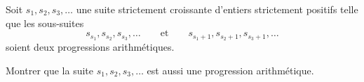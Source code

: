 Soit $s_1, s_2, s_3, \ldots$ une suite strictement croissante d'entiers strictement positifs telle que les
sous-suites
\[
s_{s_1}, s_{s_2}, s_{s_3}, \ldots \qquad \text{et} \qquad s_{s_1+1}, s_{s_2+1}, s_{s_3+1}, \ldots
\]
soient deux progressions arithmétiques.

Montrer que la suite $s_1, s_2, s_3, \ldots$ est aussi une progression arithmétique.
